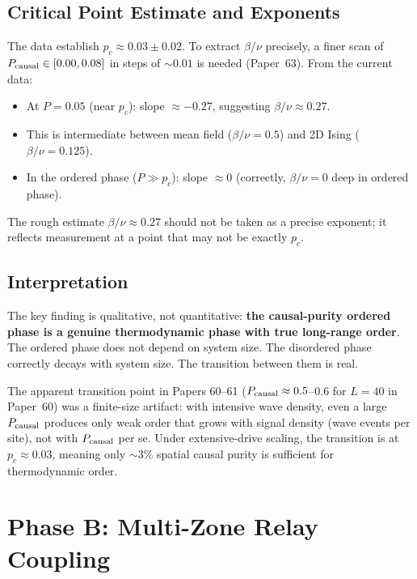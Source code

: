 \documentclass[12pt,a4paper]{article}
\begin{document}
\subsection{Critical Point Estimate and Exponents}

The data establish $p_c \approx 0.03 \pm 0.02$.
To extract $\beta/\nu$ precisely, a finer scan of $P_{\rm causal} \in [0.00, 0.08]$
in steps of $\sim 0.01$ is needed (Paper~63).
From the current data:
\begin{itemize}
  \item At $P = 0.05$ (near $p_c$): slope $\approx -0.27$, suggesting $\beta/\nu \approx 0.27$.
  \item This is intermediate between mean field ($\beta/\nu = 0.5$) and 2D Ising ($\beta/\nu = 0.125$).
  \item In the ordered phase ($P \gg p_c$): slope $\approx 0$ (correctly, $\beta/\nu = 0$ deep in ordered phase).
\end{itemize}
The rough estimate $\beta/\nu \approx 0.27$ should not be taken as a precise exponent;
it reflects measurement at a point that may not be exactly $p_c$.

\subsection{Interpretation}

The key finding is qualitative, not quantitative: \textbf{the causal-purity ordered phase
is a genuine thermodynamic phase with true long-range order}.
The ordered phase does not depend on system size.
The disordered phase correctly decays with system size.
The transition between them is real.

The apparent transition point in Papers 60--61 ($P_{\rm causal} \approx 0.5$--$0.6$
for $L = 40$ in Paper~60) was a finite-size artifact: with intensive wave density,
even a large $P_{\rm causal}$ produces only weak order that grows with signal
density (wave events per site), not with $P_{\rm causal}$ per se.
Under extensive-drive scaling, the transition is at $p_c \approx 0.03$,
meaning only $\sim 3\%$ spatial causal purity is sufficient for thermodynamic order.

\section{Phase B: Multi-Zone Relay Coupling}
\label{sec:phaseB}
\end{document}
